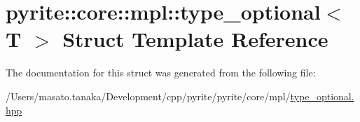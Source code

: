 \hypertarget{structpyrite_1_1core_1_1mpl_1_1type__optional}{}\section{pyrite\+:\+:core\+:\+:mpl\+:\+:type\+\_\+optional$<$ T $>$ Struct Template Reference}
\label{structpyrite_1_1core_1_1mpl_1_1type__optional}


The documentation for this struct was generated from the following file\+:\begin{DoxyCompactItemize}
\item 
/\+Users/masato.\+tanaka/\+Development/cpp/pyrite/pyrite/core/mpl/\mbox{\hyperlink{core_2mpl_2type__optional_8hpp}{type\+\_\+optional.\+hpp}}\end{DoxyCompactItemize}
